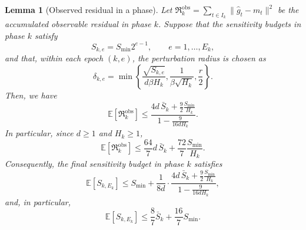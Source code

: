 \documentclass[10pt,a4paper]{amsart}
\newtheorem{lemma}{Lemma}
\newcommand{\regret}{\mathfrak{R}}
\begin{document}
\begin{lemma}[Observed residual in a phase]
\label{lem:phase-residual-vs-Sbar}
Let $\regret_k^{\mathrm{obs}}=
\sum_{t\in I_k}\|\hat g_t-m_t\|^2$ be the accumulated observable residual in phase $k$. Suppose that the
sensitivity budgets in phase $k$ satisfy
\begin{equation*}
    S_{k,e}=S_{\min}2^{e-1},\qquad e=1,\ldots,E_k,
\end{equation*}
and that, within each epoch $(k,e)$, the perturbation radius is chosen as
\begin{equation*}
    \delta_{k,e}
    =
    \min\left\{
        \frac{\sqrt{S_{k,e}}}{d\beta H_k},
        \frac{1}{\beta\sqrt{H_k}},
        \frac r2
    \right\}.
\end{equation*}
Then, we have
\begin{equation*}
\mathbb E[\regret_k^{\mathrm{obs}}]
\le
\frac{
    4d\,\bar S_k+\frac{9}{2}\frac{S_{\min}}{H_k}
}{
    1-\frac{9}{16dH_k}
}.
\end{equation*}
In particular, since $d\ge 1$ and $H_k\ge 1$,
\begin{equation*}
\mathbb E[\regret_k^{\mathrm{obs}}]
\le
\frac{64}{7}d\,\bar S_k
+
\frac{72}{7}\frac{S_{\min}}{H_k}.
\end{equation*}
Consequently, the final sensitivity budget in phase $k$ satisfies
\begin{equation*}
\mathbb E[S_{k,E_k}]
\le
S_{\min}
+
\frac{1}{8d}
\cdot
\frac{
    4d\,\bar S_k+\frac{9}{2}\frac{S_{\min}}{H_k}
}{
    1-\frac{9}{16dH_k}
},
\end{equation*}
and, in particular,
\begin{equation*}
\mathbb E[S_{k,E_k}]
\le
\frac{8}{7}\bar S_k
+
\frac{16}{7}S_{\min}.
\end{equation*}
\end{lemma}
\end{document}
